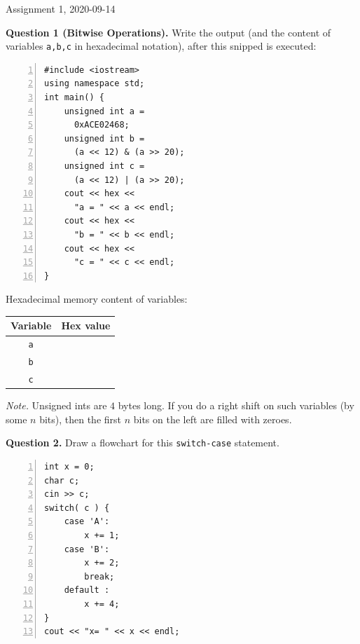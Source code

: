 \documentclass[11pt]{article}
\begin{document}
\thispagestyle{empty}

\twocolumn


\begin{center}
{\Large Assignment 1, 2020-09-14}
\end{center}


{\bf Question 1 (Bitwise Operations).} Write the output
(and the content of variables {\tt a,b,c} in hexadecimal notation),
after this snipped is executed:



\begin{center}
\begin{minipage}{.8\columnwidth}
\begin{Verbatim}[frame=single,numbers=left]
#include <iostream>
using namespace std;
int main() {
    unsigned int a = 
      0xACE02468;
    unsigned int b = 
      (a << 12) & (a >> 20);
    unsigned int c = 
      (a << 12) | (a >> 20);
    cout << hex << 
      "a = " << a << endl;
    cout << hex << 
      "b = " << b << endl;
    cout << hex << 
      "c = " << c << endl;
}
\end{Verbatim}
\end{minipage}
\end{center}

Hexadecimal memory content of variables:


\begin{tabular}{|c|c|} \hline
{\bf Variable} & {\bf Hex value} \\ \hline
{\tt \LARGE a} & \mbox{}\hspace{150pt}\mbox{} \\[20pt] \hline
{\tt \LARGE b} & \\[20pt] \hline
{\tt \LARGE c} & \\[20pt] \hline
\end{tabular}

{\em Note.} Unsigned ints are $4$ bytes long. 
If you do a right shift on 
such variables (by some $n$ bits), then the first $n$ bits 
on the left are filled with zeroes.









\vspace{20pt}
{\bf Question 2.} 
Draw a flowchart for this {\tt switch-case} statement.

\begin{center}
\begin{minipage}{.8\columnwidth}
\begin{Verbatim}[frame=single,numbers=left]
int x = 0;
char c; 
cin >> c; 
switch( c ) {
    case 'A':
        x += 1;
    case 'B':
        x += 2;
        break;
    default :
        x += 4;
}
cout << "x= " << x << endl;
\end{Verbatim}
\end{minipage}
\end{center}
\end{document}
